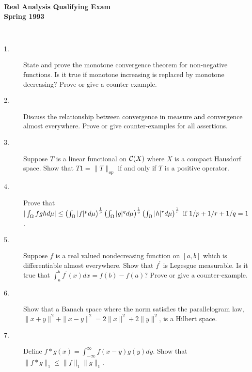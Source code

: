 \documentclass{article}
\begin{document}






\begin{center}\begin{LARGE}
{\bf Real Analysis Qualifying Exam}\\ 
{\bf Spring 1993}\\ \end{LARGE}
\end{center}
\vspace{0.1in}
\noindent\hrulefill\\

\begin{description}
\item[1.]
State and prove the monotone convergence theorem for non-negative functions.
Is it true if monotone increasing is replaced by monotone decreasing?
Prove or give a counter-example.

\item[2.]
Discuss the relationship between convergence in measure and convergence
almost everywhere. Prove or give counter-examples for all assertions.

\item[3.]
Suppose $T$ is a linear functional on ${\cal C}(X)$ where $X$ is a compact
Hausdorf space. Show that $T1 = \parallel T \parallel_{op}$ if and only if
$T$ is a positive operator.

\item[4.]
Prove that
$|\int_\Omega fgh d \mu| \leq \left(\int_\Omega |f|^p d\mu \right)^{\frac{1}{p}}
 \left(\int_\Omega |g|^q d \mu \right)^{\frac{1}{q}}
 \left( \int_\Omega |h|^r d\mu \right)^{\frac{1}{r}} \hbox{\ if\ }
 1/p + 1/r + 1/q =1$.

\item[5.]
Suppose $f$ is a real valued nondecreasing function on $[a,b]$ which is
differentiable almost everywhere. Show that $f^\prime$ is Legesgue
measurable. Is it true that $\int^b_a f^\prime(x) dx=f(b) - f(a)$? Prove
or give a counter-example.

\item[6.]
Show that a Banach space where the norm satisfies the parallelogram law,
$\parallel x+y \parallel^2 + \parallel x-y \parallel^2 =
 2\parallel x \parallel^2 + 2\parallel y \parallel^2$, is a Hilbert space.

\item[7.]
Define $f \ast g(x) = \int^\infty_{-\infty} f(x-y) g(y) dy$. Show that
$\parallel f \ast g \parallel_1 \leq \parallel f \parallel_1
 \parallel g \parallel_1$.


\end{description}
\end{document}
